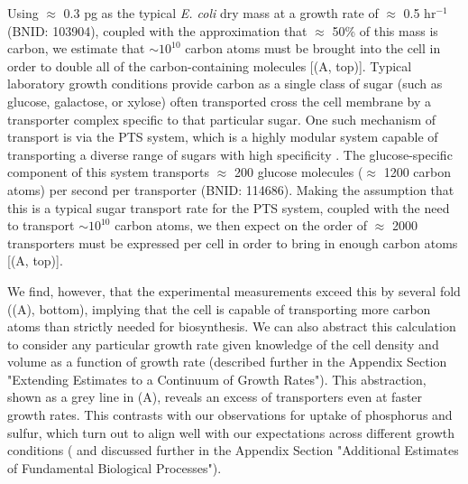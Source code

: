 Using $\approx$ 0.3 pg as the typical \textit{E. coli} dry mass at a growth rate
of $\approx$ 0.5 hr$^{-1}$ (BNID: 103904), coupled with the approximation that
$\approx$ 50\% of this mass is carbon, we estimate that $\sim 10^{10}$ carbon
atoms must be brought into the cell in order to double all of the
carbon-containing molecules [(A, top)]. Typical laboratory
growth conditions provide carbon as a single class of sugar (such as glucose,
galactose, or xylose) often transported cross the cell membrane by a transporter
complex specific to that particular sugar. One such mechanism of transport is
via the PTS system, which is a highly modular system capable of transporting a
diverse range of sugars with high specificity \citep{escalante2012}. The
glucose-specific component of this system transports $\approx$ 200 glucose
molecules ($\approx$ 1200 carbon atoms) per second per transporter (BNID:
114686). Making the assumption that this is a typical sugar transport rate for
the PTS system, coupled with the need to transport $\sim 10^{10}$ carbon atoms,
we then expect on the order of $\approx$ 2000 transporters must be expressed per
cell in order to bring in enough carbon atoms [(A, top)].

We find, however, that the experimental measurements exceed this by several fold
((A), bottom), implying that the cell is capable of
transporting more carbon atoms than strictly needed for biosynthesis. We can
also abstract this calculation to consider any particular growth rate given
knowledge of the cell density and volume as a function of growth rate (described further in the Appendix Section "Extending Estimates to a Continuum of Growth Rates"). This abstraction, shown as a grey line in (A),
reveals an excess of transporters even at faster growth rates. This contrasts
with our observations for uptake of phosphorus and sulfur, which turn out to
align well with our expectations across different growth conditions
( and discussed further in the Appendix
Section "Additional Estimates of Fundamental Biological Processes").

